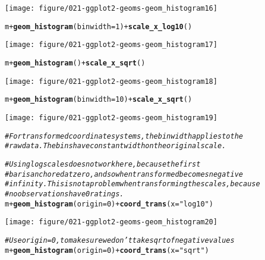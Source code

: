 \documentclass[a4paper,titlepage]{tufte-handout}\usepackage[]{graphicx}\usepackage[]{color}
\makeatletter
\def\maxwidth{ %
  \ifdim\Gin@nat@width>\linewidth
    \linewidth
  \else
    \Gin@nat@width
  \fi
}
\newcommand{\hlnum}[1]{\textcolor[rgb]{0.686,0.059,0.569}{#1}}%
\newcommand{\hlstr}[1]{\textcolor[rgb]{0.192,0.494,0.8}{#1}}%
\newcommand{\hlcom}[1]{\textcolor[rgb]{0.678,0.584,0.686}{\textit{#1}}}%
\newcommand{\hlopt}[1]{\textcolor[rgb]{0,0,0}{#1}}%
\newcommand{\hlstd}[1]{\textcolor[rgb]{0.345,0.345,0.345}{#1}}%
\newcommand{\hlkwc}[1]{\textcolor[rgb]{0.333,0.667,0.333}{#1}}%
\newcommand{\hlkwd}[1]{\textcolor[rgb]{0.737,0.353,0.396}{\textbf{#1}}}%
\newenvironment{kframe}{%
 \def\at@end@of@kframe{}%
 \ifinner\ifhmode%
  \def\at@end@of@kframe{\end{minipage}}%
  \begin{minipage}{\columnwidth}%
 \fi\fi%
 \def\FrameCommand##1{\hskip\@totalleftmargin \hskip-\fboxsep
 \colorbox{shadecolor}{##1}\hskip-\fboxsep
     \hskip-\linewidth \hskip-\@totalleftmargin \hskip\columnwidth}%
 \MakeFramed {\advance\hsize-\width
   \@totalleftmargin\z@ \linewidth\hsize
   \@setminipage}}%
 {\par\unskip\endMakeFramed%
 \at@end@of@kframe}
\newenvironment{knitrout}{}{} %
\makeatother
\begin{document}
\begin{knitrout}
\begin{kframe}
{\ttfamily\noindent\itshape\color{messagecolor}{\#\# stat\_bin: binwidth defaulted to range/30. Use 'binwidth = x' to adjust this.}}\end{kframe}
\texttt{[image: figure/021-ggplot2-geoms-geom\_histogram16]} 
\begin{kframe}\begin{alltt}
\hlstd{m} \hlopt{+} \hlkwd{geom_histogram}\hlstd{(}\hlkwc{binwidth} \hlstd{=} \hlnum{1}\hlstd{)} \hlopt{+} \hlkwd{scale_x_log10}\hlstd{()}
\end{alltt}
\end{kframe}
\texttt{[image: figure/021-ggplot2-geoms-geom\_histogram17]} 
\begin{kframe}\begin{alltt}
\hlstd{m} \hlopt{+} \hlkwd{geom_histogram}\hlstd{()} \hlopt{+} \hlkwd{scale_x_sqrt}\hlstd{()}
\end{alltt}


{\ttfamily\noindent\itshape\color{messagecolor}{\#\# stat\_bin: binwidth defaulted to range/30. Use 'binwidth = x' to adjust this.}}\end{kframe}
\texttt{[image: figure/021-ggplot2-geoms-geom\_histogram18]} 
\begin{kframe}\begin{alltt}
\hlstd{m} \hlopt{+} \hlkwd{geom_histogram}\hlstd{(}\hlkwc{binwidth} \hlstd{=} \hlnum{10}\hlstd{)} \hlopt{+} \hlkwd{scale_x_sqrt}\hlstd{()}
\end{alltt}
\end{kframe}
\texttt{[image: figure/021-ggplot2-geoms-geom\_histogram19]} 
\begin{kframe}\begin{alltt}
\hlcom{# For transformed coordinate systems, the binwidth applies to the}
\hlcom{# raw data.  The bins have constant width on the original scale.}

\hlcom{# Using log scales does not work here, because the first}
\hlcom{# bar is anchored at zero, and so when transformed becomes negative}
\hlcom{# infinity.  This is not a problem when transforming the scales, because}
\hlcom{# no observations have 0 ratings.}
\hlstd{m} \hlopt{+} \hlkwd{geom_histogram}\hlstd{(}\hlkwc{origin} \hlstd{=} \hlnum{0}\hlstd{)} \hlopt{+} \hlkwd{coord_trans}\hlstd{(}\hlkwc{x} \hlstd{=} \hlstr{"log10"}\hlstd{)}
\end{alltt}


{\ttfamily\noindent\itshape\color{messagecolor}{\#\# stat\_bin: binwidth defaulted to range/30. Use 'binwidth = x' to adjust this.}}\end{kframe}
\texttt{[image: figure/021-ggplot2-geoms-geom\_histogram20]} 
\begin{kframe}\begin{alltt}
\hlcom{# Use origin = 0, to make sure we don't take sqrt of negative values}
\hlstd{m} \hlopt{+} \hlkwd{geom_histogram}\hlstd{(}\hlkwc{origin} \hlstd{=} \hlnum{0}\hlstd{)} \hlopt{+} \hlkwd{coord_trans}\hlstd{(}\hlkwc{x} \hlstd{=} \hlstr{"sqrt"}\hlstd{)}
\end{alltt}



\end{kframe}
\end{knitrout}
\end{document}
